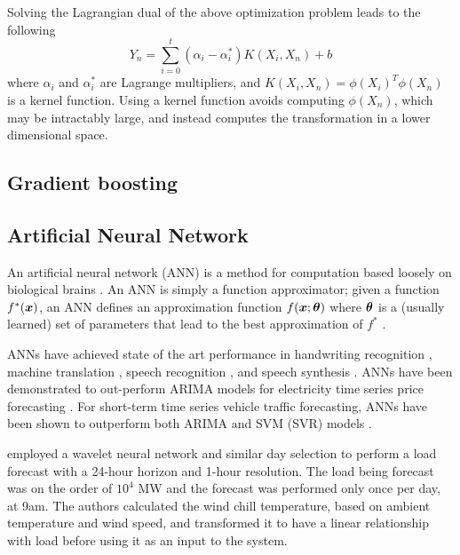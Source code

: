 \par
Solving the Lagrangian dual of the above optimization problem leads to the following
\begin{equation}
Y_n = \sum_{i=0}^{t}(\alpha_i - \alpha_i^*)K(X_i, X_n) + b
\end{equation}
where $\alpha_i$ and $\alpha_i^*$ are Lagrange multipliers, and $K(X_i, X_n) = \phi(X_i)^T\phi(X_n)$ is a kernel function. Using a kernel function avoids computing $\phi(X_n)$, which may be intractably large, and instead computes the transformation in a lower dimensional space.

\subsection{Gradient boosting}

\subsection{Artificial Neural Network}
An artificial neural network (ANN) is a method for computation based loosely on biological brains \citep{negnevitsky2005artificial}.
An ANN is simply a function approximator; given a function $f^*({\bm{x}})$, an ANN defines an approximation function $f({\bm{x}}; {\bm{\theta}})$ where ${\bm{\theta}}$ is a (usually learned) set of parameters that lead to the best approximation of $f^*$ \citep{Goodfellow-et-al-2016}. 
\par
ANNs have achieved state of the art performance in handwriting recognition \citep{2017arXiv171009829S}, machine translation \citep{Vaswani2017}, speech recognition \citep{Chiu2017}, and speech synthesis \citep{DBLP:journals/corr/OordDZSVGKSK16}.
ANNs have been demonstrated to out-perform ARIMA models for electricity time series price forecasting \citep{Mandal2010}.
For short-term time series vehicle traffic forecasting, ANNs have been shown to outperform both ARIMA and SVM (SVR) models \cite{Zhao2017}.
\par
\citet{Chen2010} employed a wavelet neural network and similar day selection to perform a load forecast with a 24-hour horizon and 1-hour resolution.
The load being forecast was on the order of $10^4$ MW and the forecast was performed only once per day, at 9am.
The authors calculated the wind chill temperature, based on ambient temperature and wind speed, and transformed it to have a linear relationship with load before using it as an input to the system.
\par
